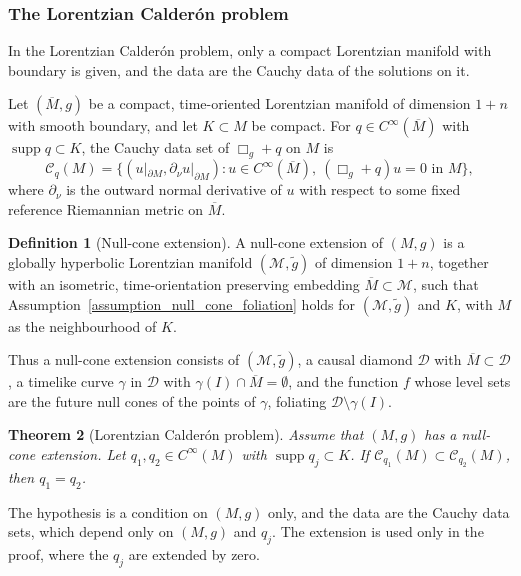\documentclass[12pt,reqno]{amsart}
\numberwithin{equation}{section}
\theoremstyle{definition}
\theoremstyle{plain}
\newtheorem{theorem}{Theorem}[section]
\theoremstyle{definition}
\newtheorem{definition}[theorem]{Definition}
\theoremstyle{definition}
\newcommand{\M}{\mathcal{M}}
\newcommand{\D}{\mathcal{D}}
\newcommand{\uu}{M}
\DeclareMathOperator{\supp}{supp}
\begin{document}
\subsubsection{The Lorentzian Calder\'on problem}

In the Lorentzian Calder\'on problem, only a compact Lorentzian manifold with boundary is given, and the data are the Cauchy data of the solutions on it.

Let $(\overline\uu,g)$ be a compact, time-oriented Lorentzian manifold of dimension $1+n$ with smooth boundary, and let $K\subset\uu$ be compact. For $q\in C^\infty(\overline\uu)$ with $\supp q\subset K$, the Cauchy data set of $\Box_g+q$ on $\uu$ is
\begin{equation}\label{eq_cds}
\mathcal C_q(\uu)=\bigl\{(u|_{\partial\uu},\partial_{\nu}u|_{\partial\uu}) : u\in C^\infty(\overline\uu),\ (\Box_g+q)u=0\text{ in }\uu\bigr\},
\end{equation}
where $\partial_\nu$ is the outward normal derivative of $u$ with respect to some fixed reference Riemannian metric on $\overline \uu$.
\begin{definition}[Null-cone extension]\label{def_extension}
A null-cone extension of $(\uu,g)$ is a globally hyperbolic Lorentzian manifold $(\M,\tilde g)$ of dimension $1+n$, together with an isometric, time-orientation preserving embedding $\overline\uu\subset\M$, such that Assumption~\ref{assumption_null_cone_foliation} holds for $(\M,\tilde g)$ and $K$, with $\uu$ as the neighbourhood of $K$.
\end{definition}

Thus a null-cone extension consists of $(\M,\tilde g)$, a causal diamond $\D$ with $\overline\uu\subset\D$, a timelike curve $\gamma$ in $\D$ with $\gamma(I)\cap\overline\uu=\emptyset$, and the function $f$ whose level sets are the future null cones of the points of $\gamma$, foliating $\D\setminus\gamma(I)$.

\begin{theorem}[Lorentzian Calder\'on problem]\label{thm_calderon}
Assume that $(\uu,g)$ has a null-cone extension. Let $q_1,q_2\in C^\infty(\uu)$ with $\supp q_j\subset K$. If $\mathcal C_{q_1}(\uu)\subset\mathcal C_{q_2}(\uu)$, then $q_1=q_2$.
\end{theorem}

The hypothesis is a condition on $(\uu,g)$ only, and the data are the Cauchy data sets, which depend only on $(\uu,g)$ and $q_j$. The extension is used only in the proof, where the $q_j$ are extended by zero.
\end{document}
